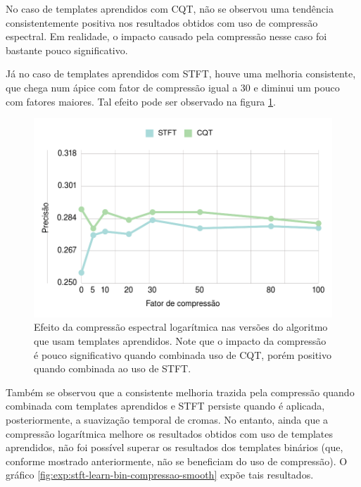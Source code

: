         No caso de templates aprendidos com CQT, não se observou uma tendência consistentemente positiva nos resultados obtidos com uso de compressão espectral. Em realidade, o impacto causado pela compressão nesse caso foi bastante pouco significativo.
        
        Já no caso de templates aprendidos com STFT, houve uma melhoria consistente, que chega num ápice com fator de compressão igual a 30 e diminui um pouco com fatores maiores. Tal efeito pode ser observado na figura \ref{fig:exp:cqt-stft-learn-compressao}.
        
        \begin{figure}[h]
            \begin{center}
                \includegraphics[width=12.5cm]{figuras/11-cqt-stft-learn-compressao.png}
                \caption{\label{fig:exp:cqt-stft-learn-compressao}Efeito da compressão espectral logarítmica nas versões do algoritmo que usam templates aprendidos. Note que o impacto da compressão é pouco significativo quando combinada uso de CQT, porém positivo quando combinada ao uso de STFT.}
            \end{center}
        \end{figure}

        Também se observou que a consistente melhoria trazida pela compressão quando combinada com templates aprendidos e STFT persiste quando é aplicada, posteriormente, a suavização temporal de cromas. No entanto, ainda que a compressão logarítmica melhore os resultados obtidos com uso de templates aprendidos, não foi possível superar os resultados dos templates binários (que, conforme mostrado anteriormente, não se beneficiam do uso de compressão). O gráfico \ref{fig:exp:stft-learn-bin-compressao-smooth} expõe tais resultados.
        

